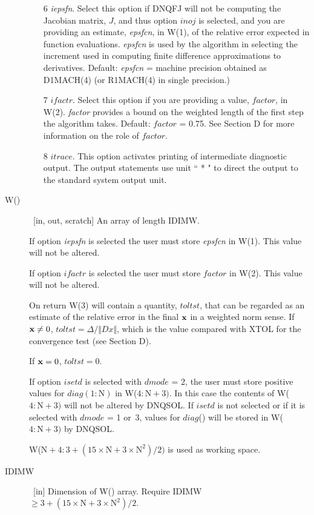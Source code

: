 \documentclass[twoside]{MATH77}
\begin{document}
\begin{description}
\begin{itemize}
\item[6]  {\em iepsfn}. Select this option if DNQFJ will not be computing the
Jacobian matrix, $J$, and thus option $inoj$ is selected, and you are
providing an estimate, {\em epsfcn}, in W(1), of the relative error expected in
function evaluations. {\em epsfcn} is used by the algorithm in selecting the
increment used in computing finite difference approximations to derivatives.
Default: {\em epsfcn} = machine precision obtained as D1MACH(4) (or R1MACH(4) in
single precision.)

\item[7]  $ifactr$. Select this option if you are providing a value, $factor$,
in W(2). {\em factor} provides a bound on the weighted length of the first step
the algorithm takes. Default: $factor$ = 0.75. See Section D for more
information on the role of $factor$.

\item[8]  $itrace$. This option activates printing of intermediate diagnostic
output. The output statements use unit `` * " to direct the output to the
standard system output unit.
\end{itemize}

\item[W()]  \ [in, out, scratch] An array of length IDIMW.

If option {\em iepsfn} is selected the user must store {\em epsfcn} in W(1). This value
will not be altered.

If option $ifactr$ is selected the user must store $factor$ in W(2). This value
will not be altered.

On return W(3) will contain a quantity, $toltst$, that can be regarded as an
estimate of the relative error in the final ${\bf x}$ in a weighted norm
sense. If ${\bf x}\neq 0$, $toltst=\Delta /\Vert Dx\Vert $, which is the
value compared with XTOL for the convergence test (see Section D).

If ${\bf x}=0$, $toltst=0.$

If option $isetd$ is selected with $dmode$ = 2, the user must store positive
values for $diag(1:\text{N})$ in W($4:\text{N}+3)$. In this case the
contents of W($4:\text{N}+3)$ will not be altered by DNQSOL. If $isetd$ is
not selected or if it is selected with $dmode$ = 1 or~3, values for $diag$()
will be stored in W($4:\text{N}+3)$ by DNQSOL.

W($\text{N}+4:3+(15 \times \text{N}+3 \times \text{N}^2)/2)$ is used as working
space.

\item[IDIMW]  \ [in] Dimension of W() array. Require IDIMW $\geq 3+(15
\times \text{N}+3 \times \text{N}^2)/2.$
\end{description}
\end{document}
